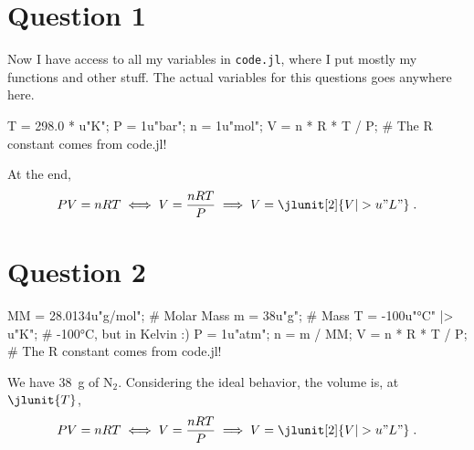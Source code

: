 \documentclass{article}
\begin{document}
    \section*{Question 1}
    Now I have access to all my variables in \texttt{code.jl}, where I put mostly my functions and other stuff. The actual variables for this questions goes anywhere here.
    \begin{jlcode}
        T = 298.0 * u"K";
        P = 1u"bar";
        n = 1u"mol";
        V = n * R * T / P; # The R constant comes from code.jl!
    \end{jlcode}
    At the end,
    \[ PV = nRT \iff V = \frac{nRT}{P} \implies V = \jlunit[2]{V |> u"L"}\;. \]
    
    \section*{Question 2}
    \begin{jlcode}
        MM = 28.0134u"g/mol"; # Molar Mass
        m = 38u"g"; # Mass
        T = -100u"°C" |> u"K"; # -100°C, but in Kelvin :)
        P = 1u"atm";
        n = m / MM;
        V = n * R * T / P; # The R constant comes from code.jl!
    \end{jlcode}
    We have \SI{38}{\gram} of N$_2$. Considering the ideal behavior, the volume is, at $ \jlunit{T} $,
    \[ PV = nRT \iff V = \frac{nRT}{P} \implies V = \jlunit[2]{V |> u"L"}\;. \]
\end{document}
